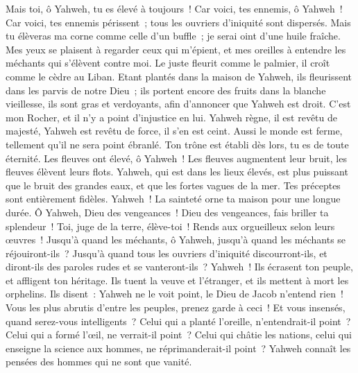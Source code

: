 \begin{multicols}{2}
Mais toi, ô Yahweh, tu es élevé à toujours~!
Car voici, tes ennemis, ô Yahweh~! Car voici, tes ennemis périssent~; tous les ouvriers d'iniquité sont dispersés.
Mais tu élèveras ma corne comme celle d'un buffle~; je serai oint d'une huile fraîche.
Mes yeux se plaisent à regarder ceux qui m'épient, et mes oreilles à entendre les méchants qui s'élèvent contre moi.
Le juste fleurit comme le palmier, il croît comme le cèdre au Liban.
Etant plantés dans la maison de Yahweh, ils fleurissent dans les parvis de notre Dieu~;
ils portent encore des fruits dans la blanche vieillesse, ils sont gras et verdoyants,
afin d'annoncer que Yahweh est droit. C'est mon Rocher, et il n'y a point d'injustice en lui.
\VerseOne{}Yahweh règne, il est revêtu de majesté, Yahweh est revêtu de force, il s'en est ceint. Aussi le monde est ferme, tellement qu'il ne sera point ébranlé.
Ton trône est établi dès lors, tu es de toute éternité.
Les fleuves ont élevé, ô Yahweh~! Les fleuves augmentent leur bruit, les fleuves élèvent leurs flots.
Yahweh, qui est dans les lieux élevés, est plus puissant que le bruit des grandes eaux, et que les fortes vagues de la mer.
Tes préceptes sont entièrement fidèles. Yahweh~! La sainteté orne ta maison pour une longue durée.
\VerseOne{}Ô Yahweh, Dieu des vengeances~! Dieu des vengeances, fais briller ta splendeur~!
Toi, juge de la terre, élève-toi~! Rends aux orgueilleux selon leurs œuvres~!
Jusqu'à quand les méchants, ô Yahweh, jusqu'à quand les méchants se réjouiront-ils~?
Jusqu'à quand tous les ouvriers d'iniquité discourront-ils, et diront-ils des paroles rudes et se vanteront-ils~?
Yahweh~! Ils écrasent ton peuple, et affligent ton héritage.
Ils tuent la veuve et l'étranger, et ils mettent à mort les orphelins.
Ils disent~: Yahweh ne le voit point, le Dieu de Jacob n'entend rien~!
Vous les plus abrutis d'entre les peuples, prenez garde à ceci~! Et vous insensés, quand serez-vous intelligents~?
Celui qui a planté l'oreille, n'entendrait-il point~? Celui qui a formé l'œil, ne verrait-il point~?
Celui qui châtie les nations, celui qui enseigne la science aux hommes, ne réprimanderait-il point~?
Yahweh connaît les pensées des hommes qui ne sont que vanité.

\end{multicols}
